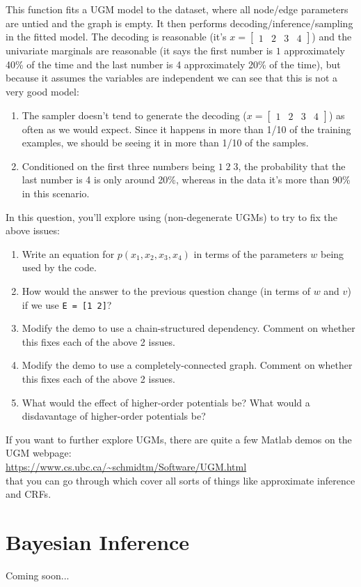 \documentclass{article}
\def\blu#1{{\color{blu}#1}}
\newcommand{\mat}[1]{\begin{bmatrix}#1\end{bmatrix}}
\def\enum#1{\begin{enumerate}#1\end{enumerate}}
\begin{document}
This function fits a UGM model to the dataset, where all node/edge parameters are untied and the graph is empty. It then performs decoding/inference/sampling in the fitted model. The decoding is reasonable (it's $x= \mat{1& 2 & 3 & 4}$) and the univariate marginals are reasonable (it says the first number is $1$ approximately 40\% of the time and the last number is 4 approximately 20\% of the time), but because it assumes the variables are independent we can see that this is not a very good model:
\enum{
\item The sampler doesn't tend to generate the decoding ($x= \mat{1& 2 & 3 & 4}$) as often as we would expect. Since it happens in more than 1/10 of the training examples, we should be seeing it in more than 1/10 of the samples.
\item Conditioned on the first three numbers being $1 \; 2 \; 3$, the probability that the last number is 4 is only around 20\%, whereas in the data it's more than 90\% in this scenario.
}
In this question, you'll explore using (non-degenerate UGMs) to try to fix the above issues:
\enum{
\item \blu{Write an equation for $p(x_1, x_2, x_3, x_4)$ in terms of the parameters $w$ being used by the code.}
\item \blu{How would the answer to the previous question change (in terms of $w$ and $v$) if we use \texttt{E = [1 2]}?}
\item Modify the demo to use a chain-structured dependency. \blu{Comment on whether this fixes each of the above 2 issues.}
\item Modify the demo to use a completely-connected graph. \blu{Comment on whether this fixes each of the above 2 issues.}
\item \blu{What would the effect of higher-order potentials be? What would a disdavantage of higher-order potentials be?}
}
If you want to further explore UGMs, there are quite a few Matlab demos on the UGM webpage:\\
\url{https://www.cs.ubc.ca/~schmidtm/Software/UGM.html}\\
that you can go through which cover all sorts of things like approximate inference and CRFs.



\section{Bayesian Inference}

Coming soon...
\end{document}
